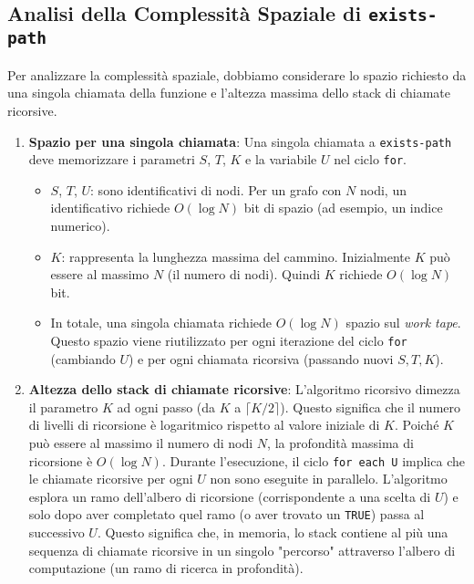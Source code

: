\documentclass[a4paper]{article}
\theoremstyle{definition} %
\begin{document}
\subsection{Analisi della Complessità Spaziale di \texttt{exists-path}}
Per analizzare la complessità spaziale, dobbiamo considerare lo spazio richiesto da una singola chiamata della funzione e l'altezza massima dello stack di chiamate ricorsive.

\begin{enumerate}
    \item \textbf{Spazio per una singola chiamata}:
        Una singola chiamata a \texttt{exists-path} deve memorizzare i parametri $S$, $T$, $K$ e la variabile $U$ nel ciclo \texttt{for}.
        \begin{itemize}
            \item $S$, $T$, $U$: sono identificativi di nodi. Per un grafo con $N$ nodi, un identificativo richiede $O(\log N)$ bit di spazio (ad esempio, un indice numerico).
            \item $K$: rappresenta la lunghezza massima del cammino. Inizialmente $K$ può essere al massimo $N$ (il numero di nodi). Quindi $K$ richiede $O(\log N)$ bit.
            \item In totale, una singola chiamata richiede $O(\log N)$ spazio sul \emph{work tape}. Questo spazio viene riutilizzato per ogni iterazione del ciclo \texttt{for} (cambiando $U$) e per ogni chiamata ricorsiva (passando nuovi $S, T, K$).
        \end{itemize}

    \item \textbf{Altezza dello stack di chiamate ricorsive}:
        L'algoritmo ricorsivo dimezza il parametro $K$ ad ogni passo (da $K$ a $\lceil K/2 \rceil$). Questo significa che il numero di livelli di ricorsione è logaritmico rispetto al valore iniziale di $K$. Poiché $K$ può essere al massimo il numero di nodi $N$, la profondità massima di ricorsione è $O(\log N)$.
        Durante l'esecuzione, il ciclo \texttt{for each U} implica che le chiamate ricorsive per ogni $U$ non sono eseguite in parallelo. L'algoritmo esplora un ramo dell'albero di ricorsione (corrispondente a una scelta di $U$) e solo dopo aver completato quel ramo (o aver trovato un \texttt{TRUE}) passa al successivo $U$. Questo significa che, in memoria, lo stack contiene al più una sequenza di chiamate ricorsive in un singolo "percorso" attraverso l'albero di computazione (un ramo di ricerca in profondità).
\end{enumerate}
\end{document}
